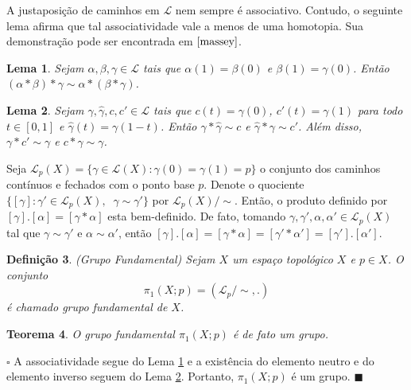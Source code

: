 \documentclass[12pt]{book}
\newtheorem{teorema}{Teorema}[section]
\newtheorem{lema}[teorema]{Lema}
\newtheorem{definicao}[teorema]{Definição}
\newenvironment{prova}[1]{$\square$ #1}{\hfill$\blacksquare$}
\newcommand{\caminhos}{\mathcal{L}}
\newcommand{\caminhospontobase}[1]{\caminhos_{#1}}
\newcommand{\caminhossempontobase}[1]{\caminhos(#1)}
\newcommand{\caminhospontobasegeral}[2]{\caminhos_{#1}(#2)}
\newcommand{\classe}[1]{[#1]}
\newcommand{\grupofundamentalpontobase}[2]{\pi_{1}(#1; #2)}
\newcommand{\intervalo}{[0,1]}
\begin{document}
	A justaposição de caminhos em $\caminhos$ nem sempre é associativo. Contudo, o seguinte lema afirma que tal associatividade vale a menos de uma homotopia. Sua demonstração pode ser encontrada em $\cite{massey}$.
	
	\begin{lema}\label{lema_associatividade_produto_caminhos}
		Sejam $\alpha, \beta, \gamma\in \caminhos$ tais que $\alpha(1)=\beta(0)$ e $\beta(1)=\gamma(0)$. Então $(\alpha*\beta)*\gamma \sim \alpha*(\beta*\gamma)$.
	\end{lema}
	
	\begin{lema}\label{lema_caminho_inverso}
		Sejam $\gamma, \hat{\gamma} , c,c' \in \caminhos$ tais que $c(t) = \gamma(0)$, $c'(t) = \gamma(1)$ para todo $t\in \intervalo$ e $\hat{\gamma} (t) = \gamma(1-t)$. Então $\gamma*\hat{\gamma}  \sim c$ e $\hat{\gamma}  *\gamma\sim c'$. Além disso, $\gamma * c' \sim\gamma$ e $c * \gamma \sim \gamma$.
	\end{lema} 	
	
	Seja $\caminhospontobasegeral{p}{X} = \{\gamma\in \caminhossempontobase{X}: \gamma(0)=\gamma(1)=p \}$ o conjunto dos caminhos contínuos e fechados com o ponto base $p$. Denote o quociente $\{ \classe{\gamma} : \gamma' \in \caminhospontobasegeral{p}{X},\;\;\gamma \sim \gamma'\}$ por $\caminhospontobasegeral{p}{X}/\sim $. Então, o produto definido por $\classe{\gamma}.\classe{\alpha} = \classe{\gamma*\alpha}$ esta bem-definido. De fato, tomando $\gamma, \gamma',\alpha, \alpha' \in \caminhospontobasegeral{p}{X}$ tal que $\gamma \sim \gamma'$ e $\alpha \sim \alpha'$, então $\classe{\gamma}.\classe{\alpha} = \classe{\gamma*\alpha} = \classe{\gamma'*\alpha'} = \classe{\gamma'}.\classe{\alpha'}$.
	
	\begin{definicao}
		(Grupo Fundamental) Sejam $X$ um espaço topológico $X$ e $p\in X$. O conjunto
		$$
		\grupofundamentalpontobase{X}{p} = (\caminhospontobase{p}/\sim, .)
		$$
		é chamado grupo fundamental de $X$.
	\end{definicao}
	
	\begin{teorema}
		O grupo fundamental $\grupofundamentalpontobase{X}{p}$ é de fato um grupo.
	\end{teorema}
	\begin{prova}
	A associatividade segue do Lema \ref{lema_associatividade_produto_caminhos} e a existência do elemento neutro e do elemento inverso  seguem do Lema \ref{lema_caminho_inverso}. Portanto, $\grupofundamentalpontobase{X}{p}$ é um grupo. 
	\end{prova}
	
\end{document}

